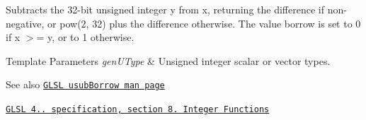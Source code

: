 Subtracts the 32-\/bit unsigned integer y from x, returning the difference if non-\/negative, or pow(2, 32) plus the difference otherwise. The value borrow is set to 0 if x $>$= y, or to 1 otherwise.


\begin{DoxyTemplParams}{Template Parameters}
{\em gen\+U\+Type} & Unsigned integer scalar or vector types.\\
\hline
\end{DoxyTemplParams}
\begin{DoxySeeAlso}{See also}
\href{http://www.opengl.org/sdk/docs/manglsl/xhtml/usubBorrow.xml}{\tt G\+L\+SL usub\+Borrow man page} 

\href{http://www.opengl.org/registry/doc/GLSLangSpec.4.20.8.pdf}{\tt G\+L\+SL 4.. specification, section 8. Integer Functions} 
\end{DoxySeeAlso}
